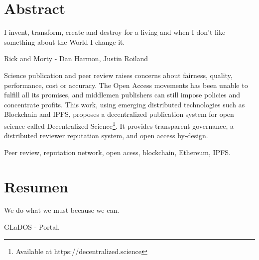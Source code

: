 %
%
%
%
%

\chapter{Abstract}

\begin{FraseCelebre}
  \begin{Frase}
    I invent, transform, create and destroy for a living and when I don't like something about the World I change it. 
  \end{Frase}
  \begin{Fuente}
    Rick and Morty -  Dan Harmon, Justin Roiland
  \end{Fuente}
\end{FraseCelebre}

Science publication and peer review raises concerns about fairness, quality,
performance, cost or accuracy. The Open Access movements has been unable to
fulfill all its promises, and middlemen publishers can still impose policies and
concentrate profits. This work, using emerging distributed technologies such as
Blockchain and IPFS, proposes a decentralized publication system for open
science called Decentralized Science\footnote{Available at
  https://decentralized.science}. It provides transparent governance, a
distributed reviewer reputation system, and open access by-design.

 Peer review, reputation network, open acess, blockchain,
Ethereum, IPFS.


\chapter{Resumen}

\begin{FraseCelebre}
  \begin{Frase}
    We do what we must because we can.
  \end{Frase}
  \begin{Fuente}
    GLaDOS - Portal.
  \end{Fuente}
\end{FraseCelebre}

